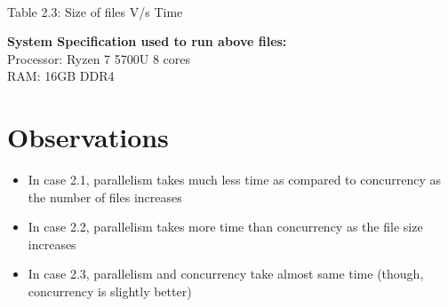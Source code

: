 \documentclass[english, 12pt]{article}
\begin{document}
\begin{center}
\begin{tabular}{|c|c|c|}
\end{tabular} \\ 
\vspace{5pt}

\label{tab:Table2.3}
\caption{Table 2.3: Size of files V/s Time}
\vspace{12pt}
\end{center}
\textbf{System Specification used to run above files:}\\
Processor: Ryzen 7 5700U 8 cores \\
RAM: 16GB DDR4
\section{Observations}
\begin{itemize}
    \item In case 2.1, parallelism takes much less time as compared to concurrency as the number of files increases
    \item In case 2.2, parallelism takes more time than concurrency as the file size increases
    \item In case 2.3, parallelism and concurrency take almost same time (though, concurrency is slightly better)
\end{itemize}
\end{document}
